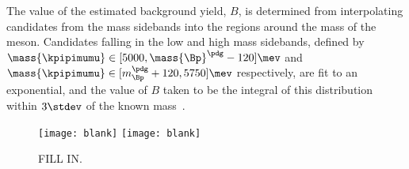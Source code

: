 
The value of the estimated background yield, $B$, is determined from interpolating
\btokpipimumu candidates from the mass sidebands into the regions around the mass of the \Bp meson.
Candidates falling in the low and high mass sidebands,
defined by
$\mass{\kpipimumu}\in[5000,\mass{\Bp}^\pdg-120]\mev$
and
$\mass{\kpipimumu}\in[m_{\Bp}^\pdg+120,5750]\mev$
respectively,
are fit to an exponential, and the value of $B$ taken to be the integral of this
distribution within $3\stdev$ of the known \Bp mass~\cite{PDG2012}.


\begin{figure}
  \begin{center}
    \texttt{[image: blank]}
    \texttt{[image: blank]}
    \caption{\small
      FILL IN.
    }
    \label{fig:kpipi:opt}
  \end{center}
\end{figure}



